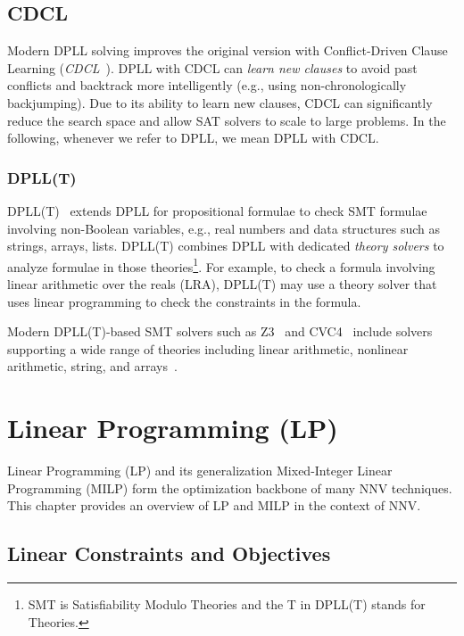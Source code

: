\documentclass[oneside,11pt,dvipsnames]{book}
\numberwithin{equation}{section}
\theoremstyle{definition}
\theoremstyle{remark}
\begin{document}
\section{CDCL}

Modern DPLL solving improves the original version with Conflict-Driven Clause Learning (\emph{CDCL}~\cite{bayardo1997using,marques1999grasp,569607}).
DPLL with CDCL can \emph{learn new clauses} to avoid past conflicts and backtrack more intelligently (e.g., using non-chronologically backjumping).
Due to its ability to learn new clauses, CDCL can significantly  reduce the search space and allow SAT solvers to scale to large problems.
In the following, whenever we refer to DPLL, we mean DPLL with CDCL.





\subsection{DPLL(T)}

DPLL(T)~\cite{nieuwenhuis2006solving} extends DPLL for propositional formulae to check SMT formulae involving non-Boolean variables, e.g., real numbers and data structures such as strings, arrays, lists.
DPLL(T) combines DPLL with dedicated \emph{theory solvers} to analyze formulae in those theories\footnote{SMT is Satisfiability Modulo Theories and the T in DPLL(T) stands for Theories.}.
For example, to check a formula involving linear arithmetic over the reals (LRA), DPLL(T) may use a theory solver that uses linear programming to check the  constraints in the formula.

Modern DPLL(T)-based SMT solvers such as Z3~\cite{de2008z3} and CVC4~\cite{barrett2011cvc4}
include solvers supporting a wide range of theories including linear arithmetic, nonlinear arithmetic, string, and arrays~\cite{kroening2016decision}.

\chapter{Linear Programming (LP)}\label{chap:lp}

Linear Programming (LP) and its generalization Mixed-Integer Linear Programming (MILP)
form the optimization backbone of many NNV techniques.
This chapter provides an overview of LP and MILP in the context of NNV.


\section{Linear Constraints and Objectives}\label{sec:lp}
\end{document}
